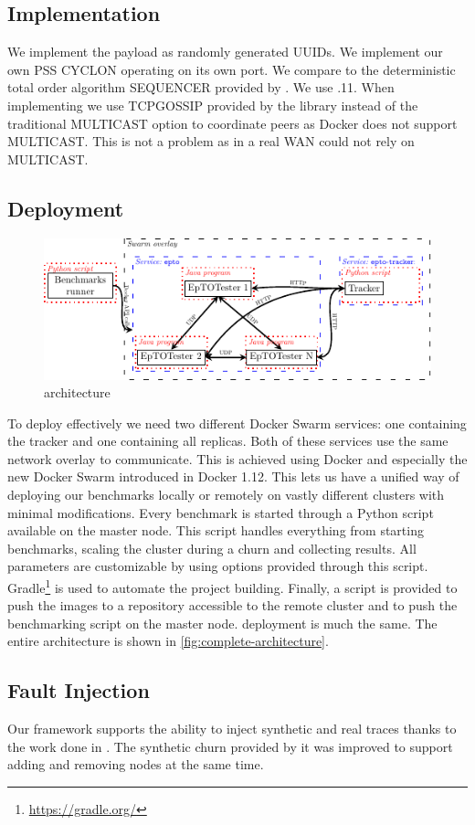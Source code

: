 \subsection{Implementation}
We implement the payload as randomly generated UUIDs. We implement our own PSS CYCLON operating on its own port.  We compare \epto to the deterministic total order algorithm SEQUENCER provided by \jgroups. We use .11. When implementing \jgroups we use TCPGOSSIP provided by the \jgroups library instead of the traditional MULTICAST option to coordinate peers as Docker does not support MULTICAST. This is not a problem as in a real WAN \jgroups could not rely on MULTICAST.
\subsection{Deployment}
 \begin{figure}[htp]
 	\centering
 	\includegraphics[width=\linewidth]{figures/complete-architecture.pdf}
 	\vspace{-2mm} 
 	\caption[Caption]{\eptotester architecture\footnotemark}
 	\vspace{-2mm} 
 	\label{fig:complete-architecture}
 \end{figure}
To deploy \epto effectively we need two different Docker Swarm services: one containing the tracker and one containing all \epto replicas. Both of these services use the same network overlay to communicate. This is achieved using Docker and especially the new Docker Swarm introduced in Docker 1.12. This lets us have a unified way of deploying our benchmarks locally or remotely on vastly different clusters with minimal modifications. Every benchmark is started through a Python script available on the master node. This script handles everything from starting benchmarks, scaling the cluster during a churn and collecting results. All \epto parameters are customizable by using options provided through this script.
Gradle\footnote{\href{https://gradle.org/}{https://gradle.org/}} is used to automate the project building. Finally, a script is provided to push the images to a repository accessible to the remote cluster and to push the benchmarking script on the master node. \jgroups deployment is much the same. The entire \eptotester architecture is shown in \autoref{fig:complete-architecture}.
\subsection{Fault Injection}
Our framework supports the ability to inject synthetic and real traces thanks to the work done in \autocite{vaucher2016erasure}. The synthetic churn provided by it was improved to support adding and removing nodes at the same time.
